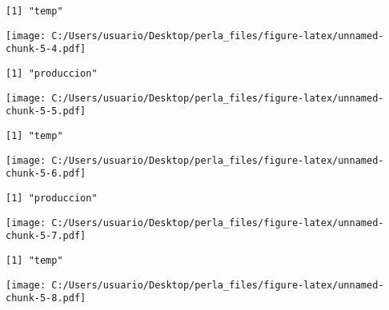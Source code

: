 \documentclass[]{article}
\begin{document}
\begin{verbatim}
[1] "temp"
\end{verbatim}

\texttt{[image: C:/Users/usuario/Desktop/perla\_files/figure-latex/unnamed-chunk-5-4.pdf]}

\begin{verbatim}
[1] "produccion"
\end{verbatim}

\texttt{[image: C:/Users/usuario/Desktop/perla\_files/figure-latex/unnamed-chunk-5-5.pdf]}

\begin{verbatim}
[1] "temp"
\end{verbatim}

\texttt{[image: C:/Users/usuario/Desktop/perla\_files/figure-latex/unnamed-chunk-5-6.pdf]}

\begin{verbatim}
[1] "produccion"
\end{verbatim}

\texttt{[image: C:/Users/usuario/Desktop/perla\_files/figure-latex/unnamed-chunk-5-7.pdf]}

\begin{verbatim}
[1] "temp"
\end{verbatim}

\texttt{[image: C:/Users/usuario/Desktop/perla\_files/figure-latex/unnamed-chunk-5-8.pdf]}
\end{document}
